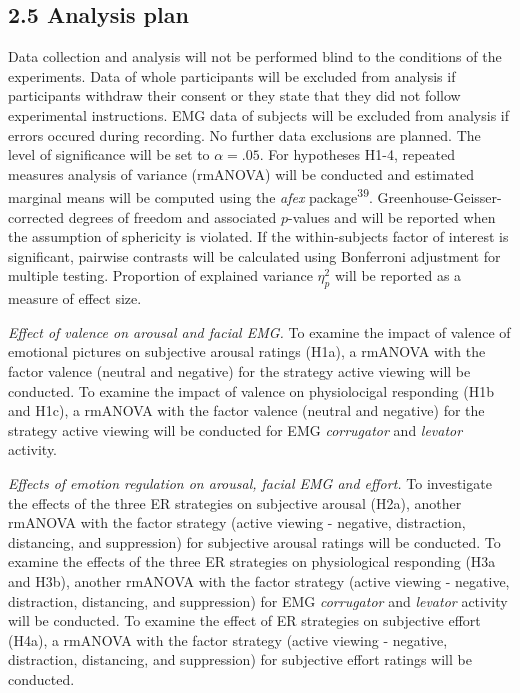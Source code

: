 \documentclass[
  english,
  man,floatsintext]{apa6}
\begin{document}
\hypertarget{analysis-plan}{%
\subsection{2.5 Analysis plan}\label{analysis-plan}}

Data collection and analysis will not be performed blind to the conditions of the experiments.
Data of whole participants will be excluded from analysis if participants withdraw their consent or they state that they did not follow experimental instructions.
EMG data of subjects will be excluded from analysis if errors occured during recording.
No further data exclusions are planned.
The level of significance will be set to \(\alpha=.05\).
For hypotheses H1-4, repeated measures analysis of variance (rmANOVA) will be conducted and estimated marginal means will be computed using the \emph{afex} package\textsuperscript{39}.
Greenhouse-Geisser-corrected degrees of freedom and associated \(p\)-values and will be reported when the assumption of sphericity is violated.
If the within-subjects factor of interest is significant, pairwise contrasts will be calculated using Bonferroni adjustment for multiple testing.
Proportion of explained variance \(\eta_{p}^{2}\) will be reported as a measure of effect size.

\emph{Effect of valence on arousal and facial EMG.}
To examine the impact of valence of emotional pictures on subjective arousal ratings (H1a), a rmANOVA with the factor valence (neutral and negative) for the strategy active viewing will be conducted.
To examine the impact of valence on physiolocigal responding (H1b and H1c), a rmANOVA with the factor valence (neutral and negative) for the strategy active viewing will be conducted for EMG \emph{corrugator} and \emph{levator} activity.

\emph{Effects of emotion regulation on arousal, facial EMG and effort.}
To investigate the effects of the three ER strategies on subjective arousal (H2a), another rmANOVA with the factor strategy (active viewing - negative, distraction, distancing, and suppression) for subjective arousal ratings will be conducted.
To examine the effects of the three ER strategies on physiological responding (H3a and H3b), another rmANOVA with the factor strategy (active viewing - negative, distraction, distancing, and suppression) for EMG \emph{corrugator} and \emph{levator} activity will be conducted.
To examine the effect of ER strategies on subjective effort (H4a), a rmANOVA with the factor strategy (active viewing - negative, distraction, distancing, and suppression) for subjective effort ratings will be conducted.
\end{document}
